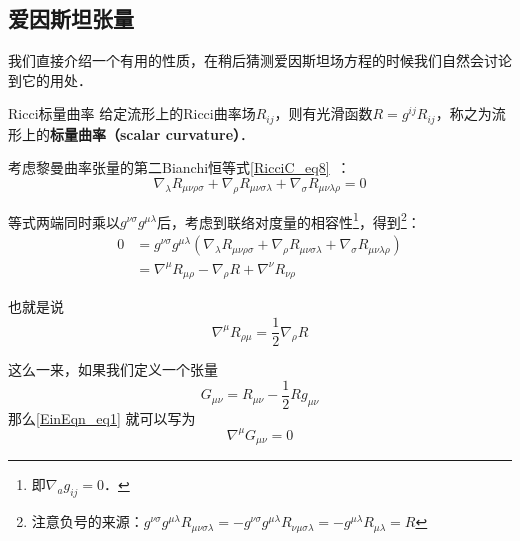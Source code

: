

\subsection{爱因斯坦张量}

我们直接介绍一个有用的性质，在稍后猜测爱因斯坦场方程的时候我们自然会讨论到它的用处．

\begin{definition}{Ricci标量曲率}
给定流形上的Ricci曲率场$R_{ij}$，则有光滑函数$R=g^{ij}R_{ij}$，称之为流形上的\textbf{标量曲率（scalar curvature）}．
\end{definition}

考虑黎曼曲率张量的第二Bianchi恒等式\autoref{RicciC_eq8}~：
\begin{equation}
\nabla_\lambda R_{\mu\nu\rho\sigma}+\nabla_\rho R_{\mu\nu\sigma\lambda}+\nabla_\sigma R_{\mu\nu\lambda\rho}=0
\end{equation}

等式两端同时乘以$g^{\nu\sigma}g^{\mu\lambda}$后，考虑到联络对度量的相容性\footnote{即$\nabla_ag_{ij}=0$．}，得到\footnote{注意负号的来源：$g^{\nu\sigma}g^{\mu\lambda}R_{\mu\nu\sigma\lambda}=-g^{\nu\sigma}g^{\mu\lambda}R_{\nu\mu\sigma\lambda}=-g^{\mu\lambda}R_{\mu\lambda}=R$}：
\begin{equation}
\begin{aligned}
0&=g^{\nu\sigma}g^{\mu\lambda}(\nabla_\lambda R_{\mu\nu\rho\sigma}+\nabla_\rho R_{\mu\nu\sigma\lambda}+\nabla_\sigma R_{\mu\nu\lambda\rho})\\
&=\nabla^\mu R_{\mu\rho}-\nabla_\rho R+\nabla^{\nu}R_{\nu\rho}
\end{aligned}
\end{equation}

也就是说
\begin{equation}\label{EinEqn_eq1}
\nabla^\mu R_{\rho\mu}=\frac{1}{2}\nabla_\rho R
\end{equation}

这么一来，如果我们定义一个张量
\begin{equation}
G_{\mu\nu}=R_{\mu\nu}-\frac{1}{2}Rg_{\mu\nu}
\end{equation}
那么\autoref{EinEqn_eq1} 就可以写为
\begin{equation}\label{EinEqn_eq2}
\nabla^\mu G_{\mu\nu}=0
\end{equation}

